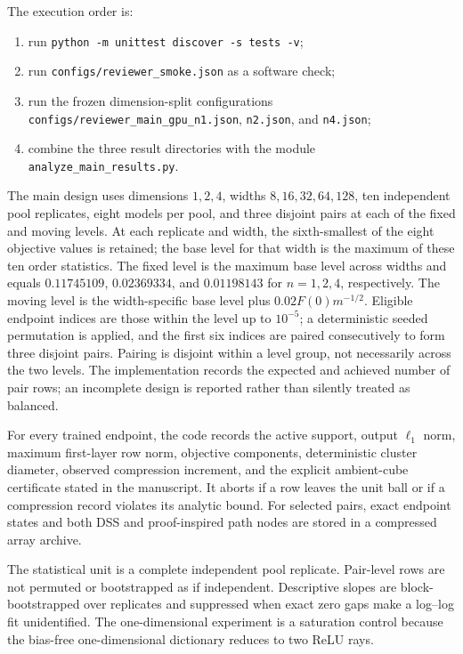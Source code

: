 \documentclass[11pt,a4paper]{article}
\begin{document}
The execution order is:
\begin{enumerate}
  \item run \texttt{python -m unittest discover -s tests -v};
  \item run \texttt{configs/reviewer\_smoke.json} as a software check;
  \item run the frozen dimension-split configurations \texttt{configs/reviewer\_main\_gpu\_n1.json}, \texttt{n2.json}, and \texttt{n4.json};
  \item combine the three result directories with the module \texttt{analyze\_main\_results.py}.
\end{enumerate}

The main design uses dimensions $1,2,4$, widths $8,16,32,64,128$, ten independent pool replicates, eight models per pool, and three disjoint pairs at each of the fixed and moving levels. At each replicate and width, the sixth-smallest of the eight objective values is retained; the base level for that width is the maximum of these ten order statistics. The fixed level is the maximum base level across widths and equals $0.11745109$, $0.02369334$, and $0.01198143$ for $n=1,2,4$, respectively. The moving level is the width-specific base level plus $0.02F(0)m^{-1/2}$. Eligible endpoint indices are those within the level up to $10^{-5}$; a deterministic seeded permutation is applied, and the first six indices are paired consecutively to form three disjoint pairs. Pairing is disjoint within a level group, not necessarily across the two levels. The implementation records the expected and achieved number of pair rows; an incomplete design is reported rather than silently treated as balanced.

For every trained endpoint, the code records the active support, output $\ell_1$ norm, maximum first-layer row norm, objective components, deterministic cluster diameter, observed compression increment, and the explicit ambient-cube certificate stated in the manuscript. It aborts if a row leaves the unit ball or if a compression record violates its analytic bound. For selected pairs, exact endpoint states and both DSS and proof-inspired path nodes are stored in a compressed array archive.

The statistical unit is a complete independent pool replicate. Pair-level rows are not permuted or bootstrapped as if independent. Descriptive slopes are block-bootstrapped over replicates and suppressed when exact zero gaps make a log--log fit unidentified. The one-dimensional experiment is a saturation control because the bias-free one-dimensional dictionary reduces to two ReLU rays.
\end{document}
